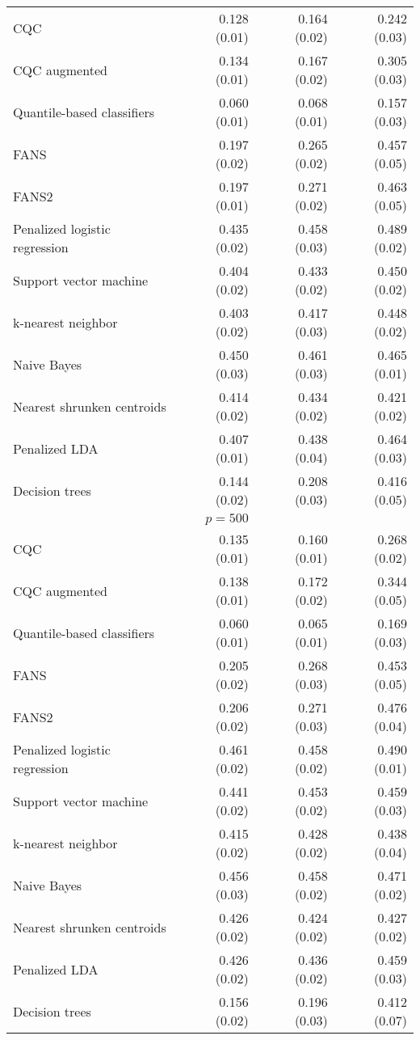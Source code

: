\begin{table}[p]
\begin{adjustbox}{max size={\textwidth}{10cm}}
\begin{tabular}{l@{\extracolsep{15mm}}rrr}
      CQC & 0.128 (0.01) & 0.164 (0.02) & 0.242 (0.03) \\ 
      CQC augmented & 0.134 (0.01) & 0.167 (0.02) & 0.305 (0.03) \\ 
      Quantile-based classifiers & 0.060 (0.01) & 0.068 (0.01) & 0.157 (0.03) \\ 
      FANS  & 0.197 (0.02) & 0.265 (0.02) & 0.457 (0.05) \\
      FANS2 & 0.197 (0.01) & 0.271 (0.02) & 0.463 (0.05) \\
      Penalized logistic regression & 0.435 (0.02) & 0.458 (0.03) & 0.489 (0.02) \\ 
      Support vector machine & 0.404 (0.02) & 0.433 (0.02) & 0.450 (0.02) \\ 
      k-nearest neighbor & 0.403 (0.02) & 0.417 (0.03) & 0.448 (0.02) \\ 
      Naive Bayes & 0.450 (0.03) & 0.461 (0.03) & 0.465 (0.01) \\ 
      Nearest shrunken centroids & 0.414 (0.02) & 0.434 (0.02) & 0.421 (0.02) \\ 
      Penalized LDA & 0.407 (0.01) & 0.438 (0.04) & 0.464 (0.03) \\ 
      Decision trees & 0.144 (0.02) & 0.208 (0.03) & 0.416 (0.05) \\ [2ex]

      \hline
      & $p = 500$ \\
      \hline

      CQC & 0.135 (0.01) & 0.160 (0.01) & 0.268 (0.02) \\ 
      CQC augmented & 0.138 (0.01) & 0.172 (0.02) & 0.344 (0.05) \\ 
      Quantile-based classifiers & 0.060 (0.01) & 0.065 (0.01) & 0.169 (0.03) \\ 
      FANS  & 0.205 (0.02) & 0.268 (0.03) & 0.453 (0.05) \\
      FANS2 & 0.206 (0.02) & 0.271 (0.03) & 0.476 (0.04) \\
      Penalized logistic regression & 0.461 (0.02) & 0.458 (0.02) & 0.490 (0.01) \\ 
      Support vector machine & 0.441 (0.02) & 0.453 (0.02) & 0.459 (0.03) \\ 
      k-nearest neighbor & 0.415 (0.02) & 0.428 (0.02) & 0.438 (0.04) \\ 
      Naive Bayes & 0.456 (0.03) & 0.458 (0.02) & 0.471 (0.02) \\ 
      Nearest shrunken centroids & 0.426 (0.02) & 0.424 (0.02) & 0.427 (0.02) \\ 
      Penalized LDA & 0.426 (0.02) & 0.436 (0.02) & 0.459 (0.03) \\ 
      Decision trees & 0.156 (0.02) & 0.196 (0.03) & 0.412 (0.07) \\ 

      \hline
      
    \end{tabular}
  \end{adjustbox}
\end{table}



